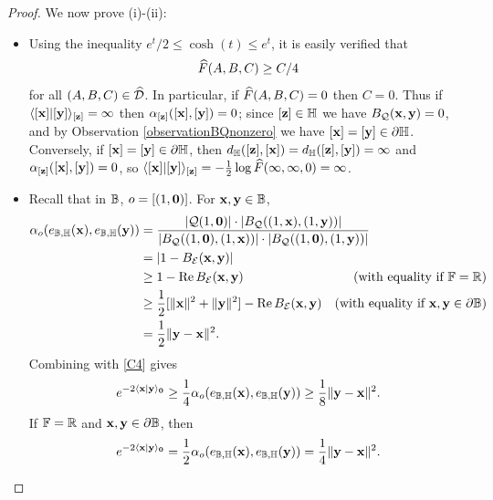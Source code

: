 \begin{proof}
We now prove (i)-(ii):
\begin{itemize}
\item[(i)] Using the inequality $e^t/2 \leq \cosh(t) \leq e^t$, it is easily verified that
\begin{equation}
\label{C4}
\widehat F(A,B,C) \geq C/4
\end{equation}
for all $(A,B,C)\in\widehat{\mathcal D}$. In particular, if $\widehat F(A,B,C) = 0$ then $C = 0$. Thus if $\langle [\mathbf x]|[\mathbf y]\rangle_{[\mathbf z]} = \infty$ then $\alpha_{[\mathbf z]}([\mathbf x],[\mathbf y]) = 0$; since $[\zz]\in\H$ we have $B_\mathcal Q(\mathbf x,\mathbf y) = 0$, and by Observation \ref{observationBQnonzero} we have $[\xx] = [\yy]\in\del\H$. Conversely, if $[\xx] = [\yy]\in\del\H$, then $\dist_\H([\zz],[\xx]) = \dist_\H([\zz],[\yy]) = \infty$ and $\alpha_{[\mathbf z]}([\mathbf x],[\mathbf y]) = 0$, so $\langle [\mathbf x]|[\mathbf y]\rangle_{[\mathbf z]} = -\frac12 \log\widehat F(\infty,\infty,0) = \infty$.

\item[(ii)] Recall that in $\B$, $o = [(1,\mathbf 0)]$. For $\xx,\yy\in\B$,
\begin{align*}
\alpha_\zero(e_{\B,\H}(\xx),e_{\B,\H}(\yy)) &= \frac{|\QQ(1,\0)|\cdot|B_\QQ((1,\xx),(1,\yy))|}{|B_\QQ((1,\0),(1,\xx))|\cdot |B_\QQ((1,\0),(1,\yy))|} \noreason\\
&= |1 - B_\EE(\xx,\yy)|\\
&\geq 1 - \Re B_\EE(\xx,\yy) &\text{(with equality if $\F = \R$)}\\
&\geq \frac12 [\|\xx\|^2 + \|\yy\|^2] - \Re B_\EE(\xx,\yy) &\text{(with equality if $\xx,\yy\in\del\B$)}\\
&= \frac12\|\yy - \xx\|^2.
\end{align*}
Combining with \eqref{C4} gives
\[
e^{-2\lb \xx|\yy\rb_\0} \geq \frac14\alpha_\zero(e_{\B,\H}(\xx),e_{\B,\H}(\yy)) \geq \frac18\|\yy - \xx\|^2.
\]
If $\F = \R$ and $\xx,\yy\in\del\B$, then
\[
e^{-2\lb \xx|\yy\rb_\0} = \frac12\alpha_\zero(e_{\B,\H}(\xx),e_{\B,\H}(\yy)) = \frac14\|\yy - \xx\|^2.
\]
\end{itemize}
\end{proof}


